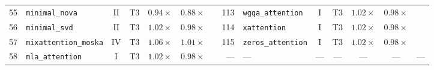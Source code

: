 \begin{table}[p]
{\begin{tabular}{r l c c c c l | r l c c c c l}
55 & \texttt{minimal\_nova} & II & T3 & $0.94\times$ & $0.88\times$ & \passslow{} & 113 & \texttt{wgqa\_attention} & I & T3 & $1.02\times$ & $0.98\times$ & \passslow{} \\
56 & \texttt{minimal\_svd} & II & T3 & $1.02\times$ & $0.98\times$ & \passslow{} & 114 & \texttt{xattention} & I & T3 & $1.02\times$ & $0.98\times$ & \passslow{} \\
57 & \texttt{mixattention\_moska} & IV & T3 & $1.06\times$ & $1.01\times$ & \passfast{} & 115 & \texttt{zeros\_attention} & I & T3 & $1.02\times$ & $0.98\times$ & \passslow{} \\
58 & \texttt{mla\_attention} & I & T3 & $1.02\times$ & $0.98\times$ & \passslow{} & — & — & — & — & — & — & — \\
\bottomrule
\end{tabular}%
}
\end{table}

